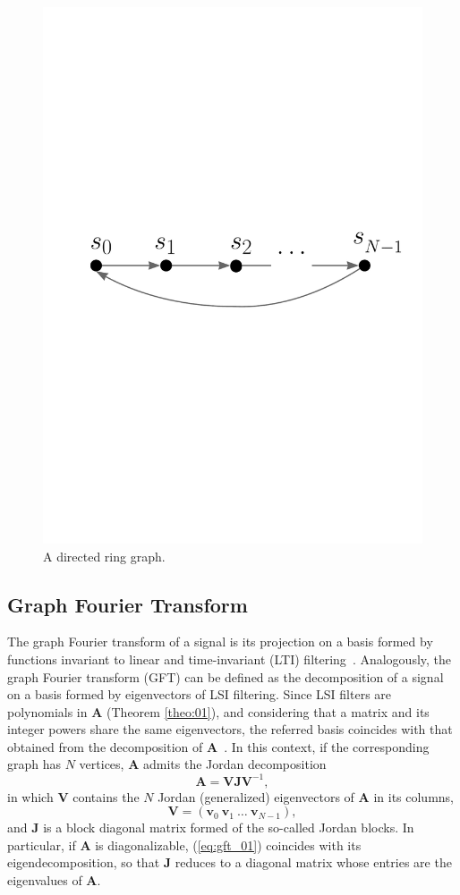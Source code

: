 \begin{figure}[t!]
	\centering
\includegraphics[width=0.6\linewidth]{Figures/signal_ring_graph_white_border.pdf}
	\caption{A directed ring graph.}%
	\label{fig:graphs}%
	\vspace{-0.5cm}
\end{figure}
\subsection{Graph Fourier Transform}

The graph Fourier transform of a signal is its projection on a basis formed by functions invariant to linear and time-invariant (LTI) filtering~\cite{oppenheim1997signals}. Analogously, the graph Fourier transform (GFT) can be defined as the decomposition of a signal on a basis formed by eigenvectors of LSI filtering. Since LSI filters are polynomials in $ \mathbf{A} $ (Theorem \ref{theo:01}), and considering that a matrix and its integer powers share the same eigenvectors, the referred basis coincides with that obtained from the decomposition of $\mathbf{A}$~\cite{sandryhaila2013gft}. In this context, if the corresponding graph has $ N $ vertices, $\mathbf{A} $ admits the Jordan decomposition
\begin{equation}\label{eq:gft_01}
\mathbf{A} = \mathbf{V} \mathbf{J} \mathbf{V}^{-1},
\end{equation}
in which $ \mathbf{V} $ contains the $ N $ Jordan (generalized) eigenvectors of $ \mathbf{A} $ in its columns,
\begin{equation}\label{eq:gft_02}
\mathbf{V} = \left(\mathbf{v}_0 \ \mathbf{v}_1 \ \dots\ \mathbf{v}_{N-1}\right),
\end{equation}
and $\mathbf{J}$ is a block diagonal matrix formed of the so-called Jordan blocks. In particular, if $\mathbf{A}$ is diagonalizable, (\ref{eq:gft_01}) coincides with its eigendecomposition, so that $\mathbf{J}$ reduces to a diagonal matrix whose entries are the eigenvalues of $\mathbf{A}$.

